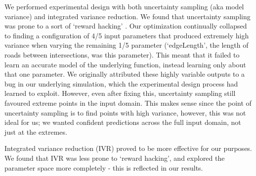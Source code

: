 We performed experimental design with both uncertainty sampling (aka model variance) and integrated variance reduction. We found that uncertainty sampling was prone to a sort of `reward hacking' \cite{hadfield-menellInverseRewardDesign2020}. Our optimization continually collapsed to finding a configuration of 4/5 input parameters that produced extremely high variance when varying the remaining 1/5 parameter (`edgeLength', the length of roads between intersections, was this parameter). This meant that it failed to learn an accurate model of the underlying function, instead learning only about that one parameter. We originally attributed these highly variable outputs to a bug in our underlying simulation, which the experimental design process had learned to exploit. However, even after fixing this, uncertainty sampling still favoured extreme points in the input domain. This makes sense since the point of uncertainty sampling is to find points with high variance, however, this was not ideal for us; we wanted confident predictions across the full input domain, not just at the extremes.

Integrated variance reduction (IVR) \cite{sacksDesignAnalysisComputer1989} proved to be more effective for our purposes. We found that IVR was less prone to `reward hacking', and explored the parameter space more completely - this is reflected in our results.



